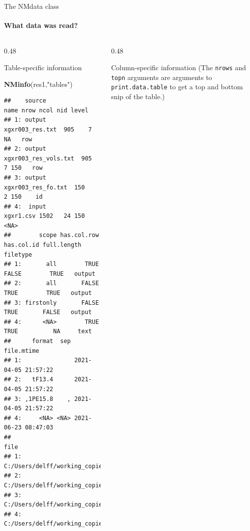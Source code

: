 \documentclass[
  8pt,
  ignorenonframetext,
  aspectratio=169]{beamer}
\newenvironment{Shaded}{\begin{snugshade}}{\end{snugshade}}
\newcommand{\KeywordTok}[1]{\textcolor[rgb]{0.13,0.29,0.53}{\textbf{#1}}}
\newcommand{\NormalTok}[1]{#1}
\newcommand{\StringTok}[1]{\textcolor[rgb]{0.31,0.60,0.02}{#1}}
\begin{document}
\begin{frame}[fragile]{The NMdata class}
\protect\hypertarget{the-nmdata-class-1}{}
\framesubtitle{What data was read?}

\begin{columns}[T]
\begin{column}{0.48\textwidth}
\begin{block}{Table-specific information}
\protect\hypertarget{table-specific-information}{}
\scriptsize

\begin{Shaded}
\begin{Highlighting}[]
\KeywordTok{NMinfo}\NormalTok{(res1,}\StringTok{"tables"}\NormalTok{)}
\end{Highlighting}
\end{Shaded}

\begin{verbatim}
##    source                 name nrow ncol nid level
## 1: output      xgxr003_res.txt  905    7  NA   row
## 2: output xgxr003_res_vols.txt  905    7 150   row
## 3: output   xgxr003_res_fo.txt  150    2 150    id
## 4:  input            xgxr1.csv 1502   24 150  <NA>
##        scope has.col.row has.col.id full.length filetype
## 1:       all        TRUE      FALSE        TRUE   output
## 2:       all       FALSE       TRUE        TRUE   output
## 3: firstonly       FALSE       TRUE       FALSE   output
## 4:      <NA>        TRUE       TRUE          NA     text
##      format  sep          file.mtime
## 1:               2021-04-05 21:57:22
## 2:   tF13.4      2021-04-05 21:57:22
## 3: ,1PE15.8    , 2021-04-05 21:57:22
## 4:     <NA> <NA> 2021-06-23 08:47:03
##                                                                              file
## 1:      C:/Users/delff/working_copies/NMdata/inst/examples/nonmem/xgxr003_res.txt
## 2: C:/Users/delff/working_copies/NMdata/inst/examples/nonmem/xgxr003_res_vols.txt
## 3:   C:/Users/delff/working_copies/NMdata/inst/examples/nonmem/xgxr003_res_fo.txt
## 4:              C:/Users/delff/working_copies/NMdata/inst/examples/data/xgxr1.csv
\end{verbatim}
\end{block}
\end{column}

\begin{column}{0.48\textwidth}
\begin{block}{Column-specific information}
\protect\hypertarget{column-specific-information}{}
(The \texttt{nrows} and \texttt{topn} arguments are arguments to
\texttt{print.data.table} to get a top and bottom snip of the table.)
\scriptsize


\end{block}
\end{column}
\end{columns}
\end{frame}
\end{document}
